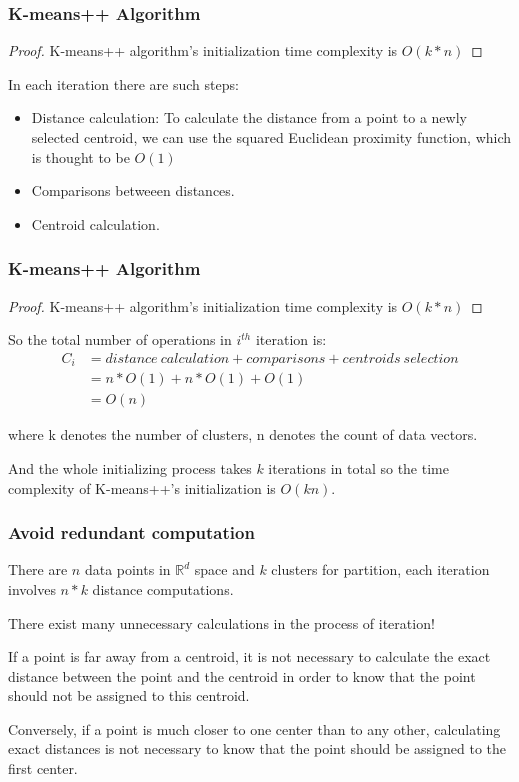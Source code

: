 \documentclass[9pt]{beamer}
\newcommand{\ccp}[1]{{\color{purple}#1}}
\begin{document}
\begin{frame}
	\frametitle{K-means++ Algorithm}
	\begin{proof}
		K-means++ algorithm's initialization time complexity is $O(k*n)$
	\end{proof}
		\par In each iteration there are such steps:
		\begin{itemize}
			\item Distance calculation: To calculate the distance from a point to a newly selected centroid, we can use the squared Euclidean proximity function, which is thought to be $O(1)$
			\item Comparisons betweeen distances.
			\item Centroid calculation.
		\end{itemize}
\end{frame}

\begin{frame}
	\frametitle{K-means++ Algorithm}
	\begin{proof}
		K-means++ algorithm's initialization time complexity is $O(k*n)$
	\end{proof}
		\par So the total number of operations in $i^{th}$ iteration is:
		\begin{equation*}
			\begin{split}
				C_i &=  distance\ calculation + comparisons + centroids\ selection\\
				& = n * O(1) + n * O(1) + O(1) \\
				& = O(n)
			\end{split}
		\end{equation*}
		\par where k denotes the number of clusters, n denotes the count of data vectors.
		\par And the whole initializing process takes $k$ iterations in total so the time complexity of K-means++'s initialization is $O(kn)$.

\end{frame}

\begin{frame}
	\frametitle{Avoid redundant computation}
	There are $n$ data points in $\mathbb{R}^ d$ space and $k$ clusters for partition, each iteration involves $n * k$ distance computations.\par
	There exist many unnecessary calculations in the process of iteration! \par
	\pause
	\par If a point is \ccp{far away from a centroid}, it is not necessary to calculate the exact distance between the point and the centroid in order to know that the point should not be assigned to this centroid.\par
 Conversely, \ccp{if a point is much closer to one center than to any other}, calculating exact distances is not necessary to know that the point should be assigned to the first center. 


\end{frame}
\end{document}
